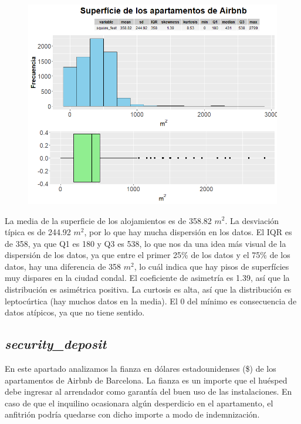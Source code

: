 \documentclass{article}
\begin{document}
\vspace{0.35cm}
\begin{figure}[h]
\hspace*{-0.15cm}
\centering
\includegraphics[scale = 0.6]{grafico_square_feet}
\end{figure}
\vspace{0.15cm}

La media de la superficie de los alojamientos es de 358.82 $m^2$.
La desviación típica es de 244.92 $m^2$, por lo que hay mucha dispersión en los datos.
El IQR es de 358, ya que Q1 es 180 y Q3 es 538, lo que nos da una idea más visual de la dispersión de los datos, ya que entre el primer 25\% de los datos y el 75\% de los datos, hay una diferencia de 358 $m^2$, lo cuál indica que hay pisos de superfícies muy dispares en la ciudad condal.
El coeficiente de asimetría es 1.39, así que la distribución es asimétrica positiva.
La curtosis es alta, así que la distribución es leptocúrtica (hay muchos datos en la media).
El 0 del mínimo es consecuencia de datos atípicos, ya que no tiene sentido.

\clearpage
\subsection{\emph{security\_deposit}}
En este apartado analizamos la fianza en dólares estadounidenses (\$) de los apartamentos de Airbnb de Barcelona. La fianza es un importe que el huésped debe ingresar al arrendador como garantía del buen uso de las instalaciones. En caso de que el inquilino ocasionara algún desperdicio en el apartamento, el anfitrión podría quedarse con dicho importe a modo de indemnización. 
\end{document}
